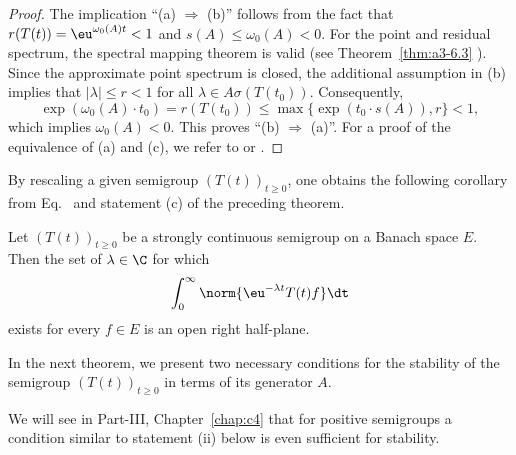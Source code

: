 \begin{proof} The implication ``(a) $ \Rightarrow $ (b)'' follows from the fact that $ r(T(t)) = \eu^{\omega_{0}(A) t} < 1 $ and $ s(A) \leq \omega_{0}(A) < 0 $. For the point and residual spectrum, the spectral mapping theorem is valid (see Theorem~\ref{thm:a3-6.3} ). Since the approximate point spectrum is closed, the additional assumption in (b)
implies that $ |\lambda| \leq r < 1 $ for all $ \lambda \in A\sigma(T(t_0)) $. 
Consequently, 
\[
\exp(\omega_{0}(A) \cdot t_0) = r(T(t_0)) \leq \max\{\exp(t_0 \cdot s(A)), r\} < 1,
\]
which implies $ \omega_{0}(A) < 0 $. 
This proves \textquotedblleft (b) $\Rightarrow$ (a)\textquotedblright. 
For a proof of the equivalence of (a) and (c), we refer to \textcite{datko:1972} or \textcite[Theorem~4.4.1]{pazy:1983}. 
\end{proof}
By rescaling a given semigroup $ (T(t))_{t \geq 0} $, one obtains the following corollary from Eq.~ and statement (c) of the preceding theorem.
\begin{corollary} \label{cor:a4-1.12} 
Let $ (T(t))_{t \geq 0} $ be a strongly continuous semigroup on a Banach space $ E $. Then the set of\/ $ \lambda \in \C$ for which
\[
\int_{0}^{\infty} \norm{\eu^{-\lambda t} T (t) f }  \dt 
\]
exists for every $ f \in E $  is an open right half-plane.
\end{corollary}
In the next theorem, we present two necessary conditions for the stability of the semigroup $ (T(t))_{t \geq 0} $ in terms of its generator $ A $. 

We will see in Part-III, Chapter~\ref{chap:c4} that for positive semigroups a condition similar to statement (ii) below is even sufficient for stability. 


